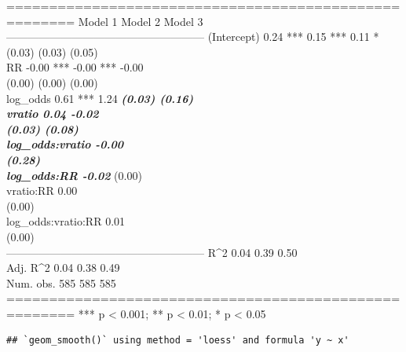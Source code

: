 \documentclass[
  english,
  man,floatsintext]{apa6}
\begin{document}
======================================================
Model 1 Model 2 Model 3\\
------------------------------------------------------
(Intercept) 0.24 *** 0.15 *** 0.11 *\\
(0.03) (0.03) (0.05)\\
RR -0.00 *** -0.00 *** -0.00\\
(0.00) (0.00) (0.00)\\
log\_odds 0.61 *** 1.24 \textbf{\emph{
(0.03) (0.16)\\
vratio 0.04 -0.02\\
(0.03) (0.08)\\
log\_odds:vratio -0.00\\
(0.28)\\
log\_odds:RR -0.02 }}
(0.00)\\
vratio:RR 0.00\\
(0.00)\\
log\_odds:vratio:RR 0.01\\
(0.00)\\
------------------------------------------------------
R\^{}2 0.04 0.39 0.50\\
Adj. R\^{}2 0.04 0.38 0.49\\
Num. obs. 585 585 585\\
======================================================
*** p \textless{} 0.001; ** p \textless{} 0.01; * p \textless{} 0.05

\begin{verbatim}
## `geom_smooth()` using method = 'loess' and formula 'y ~ x'
\end{verbatim}
\end{document}
